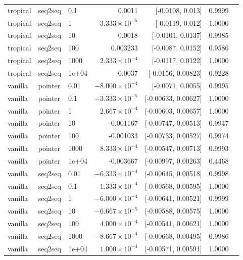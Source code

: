 \documentclass[10pt]{article}
\begin{document}
{\begin{longtable}{lllrrrl}
tropical & seq2seq & 0.1 & 0.0011 & [-0.0108, 0.013] & 0.9999 & \\
tropical & seq2seq & 1 & $3.333\times10^{-5}$ & [-0.0119, 0.012] & 1.0000 & \\
tropical & seq2seq & 10 & 0.0018 & [-0.0101, 0.0137] & 0.9985 & \\
tropical & seq2seq & 100 & 0.003233 & [-0.0087, 0.0152] & 0.9586 & \\
tropical & seq2seq & 1000 & $2.333\times10^{-4}$ & [-0.0117, 0.0122] & 1.0000 & \\
tropical & seq2seq & 1e+04 & -0.0037 & [-0.0156, 0.00823] & 0.9228 & \\
vanilla & pointer & 0.01 & $-8.000\times10^{-4}$ & [-0.0071, 0.0055] & 0.9995 & \\
vanilla & pointer & 0.1 & $-3.333\times10^{-5}$ & [-0.00633, 0.00627] & 1.0000 & \\
vanilla & pointer & 1 & $2.667\times10^{-4}$ & [-0.00603, 0.00657] & 1.0000 & \\
vanilla & pointer & 10 & -0.001167 & [-0.00747, 0.00513] & 0.9947 & \\
vanilla & pointer & 100 & -0.001033 & [-0.00733, 0.00527] & 0.9974 & \\
vanilla & pointer & 1000 & $8.333\times10^{-4}$ & [-0.00547, 0.00713] & 0.9993 & \\
vanilla & pointer & 1e+04 & -0.003667 & [-0.00997, 0.00263] & 0.4468 & \\
vanilla & seq2seq & 0.01 & $-6.333\times10^{-4}$ & [-0.00645, 0.00518] & 0.9998 & \\
vanilla & seq2seq & 0.1 & $1.333\times10^{-4}$ & [-0.00568, 0.00595] & 1.0000 & \\
vanilla & seq2seq & 1 & $-6.000\times10^{-4}$ & [-0.00641, 0.00521] & 0.9999 & \\
vanilla & seq2seq & 10 & $-6.667\times10^{-5}$ & [-0.00588, 0.00575] & 1.0000 & \\
vanilla & seq2seq & 100 & $4.000\times10^{-4}$ & [-0.00541, 0.00621] & 1.0000 & \\
vanilla & seq2seq & 1000 & $-8.667\times10^{-4}$ & [-0.00668, 0.00495] & 0.9986 & \\
vanilla & seq2seq & 1e+04 & $1.000\times10^{-4}$ & [-0.00571, 0.00591] & 1.0000 & \\
\bottomrule
\end{longtable}
}
\end{document}
